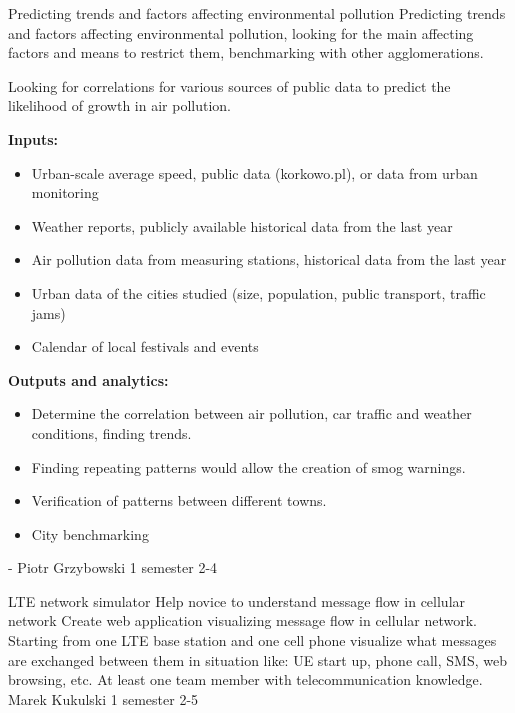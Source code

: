 \begin{project}
{Predicting trends and factors affecting environmental pollution}
{Predicting trends and factors affecting environmental pollution, looking for the main affecting factors and means to restrict them, benchmarking with other agglomerations.} 
{ 
Looking for correlations for various sources of public data to predict the likelihood of growth in air pollution.

\textbf{Inputs:}
\begin{itemize}
	\item Urban-scale average speed, public data (korkowo.pl), or data from urban monitoring
	\item Weather reports, publicly available historical data from the last year
	\item Air pollution data from measuring stations, historical data from the last year
	\item Urban data of the cities studied (size, population, public transport, traffic jams)
	\item Calendar of local festivals and events
\end{itemize} 
\textbf{Outputs and analytics:}
\begin{itemize}
	\item Determine the correlation between air pollution, car traffic and weather conditions, finding trends.
	\item Finding repeating patterns would allow the creation of smog warnings.
	\item Verification of patterns between different towns.
	\item City benchmarking
\end{itemize} 
}
{-}
{Piotr Grzybowski}
{1 semester}
{2-4}
\end{project}
\begin{project}
{LTE network simulator}
{Help novice to understand message flow in cellular network} 
{ 
Create web application visualizing message flow in cellular network. Starting
from one LTE base station and one cell phone visualize what messages are exchanged between them 
in situation like: UE start up, phone call, SMS, web browsing, etc.
}
{At least one team member with telecommunication knowledge.}
{Marek Kukulski}
{1 semester}
{2-5}
\end{project}
